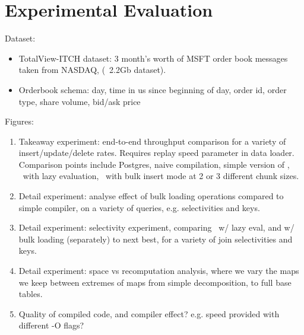 \section{Experimental Evaluation}

Dataset:

\begin{itemize}
  \item TotalView-ITCH dataset: 3 month's worth of MSFT order book messages
  taken from NASDAQ, (~2.2Gb dataset).
  \item Orderbook schema: day, time in us since beginning of day, order id,
  order type, share volume, bid/ask price
\end{itemize}

Figures:

\begin{enumerate}
  \item Takeaway experiment: end-to-end throughput comparison for a variety of
  insert/update/delete rates. Requires replay speed parameter in data loader.
  Comparison points include Postgres, naive compilation, simple version
  of \compiler, \compiler\ with lazy evaluation, \compiler\ with bulk insert
  mode at 2 or 3 different chunk sizes.
  \item Detail experiment: analyse effect of bulk loading operations compared to
  simple compiler, on a variety of queries, e.g. selectivities and keys.
  \item Detail experiment: selectivity experiment, comparing \compiler\ w/ lazy
  eval, and w/ bulk loading (separately) to next best, for a variety of
  join selectivities and keys.
  \item Detail experiment: space vs recomputation analysis, where we vary the
  maps we keep between extremes of maps from simple decomposition, to full base
  tables.
  \item Quality of compiled code, and compiler effect? e.g. speed provided with
  different -O flags?
\end{enumerate}